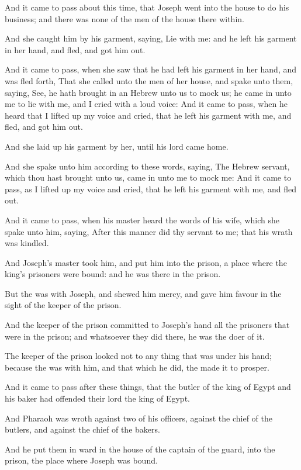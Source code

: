 \Verse And it came to pass about this time, that Joseph went into the house to do his business; and there was none of the men of the house there within.

\Verse And she caught him by his garment, saying, Lie with me: and he left his garment in her hand, and fled, and got him out.

\Verse And it came to pass, when she saw that he had left his garment in her hand, and was fled forth, \Verse That she called unto the men of her house, and spake unto them, saying, See, he hath brought in an Hebrew unto us to mock us; he came in unto me to lie with me, and I cried with a loud voice: \Verse And it came to pass, when he heard that I lifted up my voice and cried, that he left his garment with me, and fled, and got him out.

\Verse And she laid up his garment by her, until his lord came home.

\Verse And she spake unto him according to these words, saying, The Hebrew servant, which thou hast brought unto us, came in unto me to mock me: \Verse And it came to pass, as I lifted up my voice and cried, that he left his garment with me, and fled out.

\Verse And it came to pass, when his master heard the words of his wife, which she spake unto him, saying, After this manner did thy servant to me; that his wrath was kindled.

\Verse And Joseph's master took him, and put him into the prison, a place where the king's prisoners were bound: and he was there in the prison.

\Verse But the \LORD was with Joseph, and shewed him mercy, and gave him favour in the sight of the keeper of the prison.

\Verse And the keeper of the prison committed to Joseph's hand all the prisoners that were in the prison; and whatsoever they did there, he was the doer of it.

\Verse The keeper of the prison looked not to any thing that was under his hand; because the \LORD was with him, and that which he did, the \LORD made it to prosper.

\Chapter
\Verse And it came to pass after these things, that the butler of the king of Egypt and his baker had offended their lord the king of Egypt.

\Verse And Pharaoh was wroth against two of his officers, against the chief of the butlers, and against the chief of the bakers.

\Verse And he put them in ward in the house of the captain of the guard, into the prison, the place where Joseph was bound.

